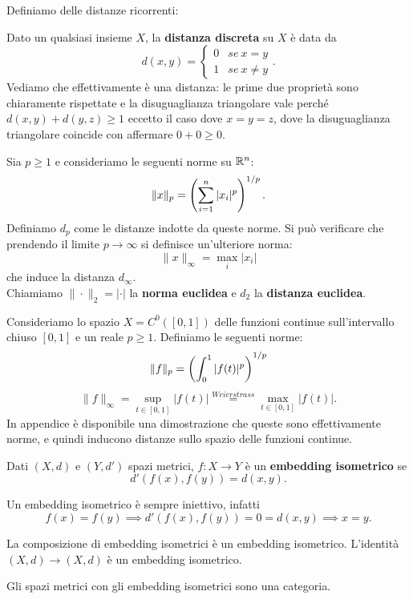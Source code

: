\begin{multicols*}{2}
\noindent Definiamo delle distanze ricorrenti:
\begin{definition}
Dato un qualsiasi insieme $X$, la \textbf{distanza discreta} su $X$ è data da
\[d(x,y)=\begin{cases}
0& se\ x=y\\
1& se\ x\neq y
\end{cases}.\]
Vediamo che effettivamente è una distanza: le prime due proprietà sono chiaramente rispettate e la disuguaglianza triangolare vale perché $d(x,y)+d(y,z)\geq1$ eccetto il caso dove $x=y=z$, dove la disuguaglianza triangolare coincide con affermare $0+0\geq0$.
\end{definition}
\begin{definition}[Distanze $p$]
Sia $p\geq1$ e consideriamo le seguenti norme su $\mathbb{R}^n$:
\[\|x\|_p=\left(\sum_{i=1}^n|x_i|^p\right)^{1/p}.\]
Definiamo $d_p$ come le distanze indotte da queste norme. Si può verificare che prendendo il limite $p\to\infty$ si definisce un'ulteriore norma:
\[\|x\|_\infty=\max_i|x_i|\]
che induce la distanza $d_\infty$.\\
Chiamiamo $\|\cdot\|_2=|\cdot|$ la \textbf{norma euclidea} e $d_2$ la \textbf{distanza euclidea}.
\end{definition}

\begin{definition}
Consideriamo lo spazio $X=C^0([0,1])$ delle funzioni continue sull'intervallo chiuso $[0,1]$ e un reale $p\geq1$. Definiamo le seguenti norme:
\[\|f\|_p=\left(\int_0^1|f(t)|^p\right)^{1/p}\]
\[\|f\|_\infty=\sup_{t\in[0,1]}|f(t)|\overset{Weierstrass}{=}\max_{t\in[0,1]}|f(t)|.\]
In appendice è disponibile una dimostrazione che queste sono effettivamente norme, e quindi inducono distanze sullo spazio delle funzioni continue.
\end{definition}

\begin{definition}
Dati $(X,d)$ e $(Y,d')$ spazi metrici, $f:X\to Y$ è un \textbf{embedding isometrico} se \[d'(f(x),f(y))=d(x,y).\]
\end{definition}
\begin{remark}
Un embedding isometrico è sempre iniettivo, infatti
\[f(x)=f(y)\implies d'(f(x),f(y))=0=d(x,y)\implies x=y.\]
\end{remark}
\begin{remark}
La composizione di embedding isometrici è un embedding isometrico. L'identità $(X,d)\to(X,d)$ è un embedding isometrico.
\end{remark}
\begin{remark}
Gli spazi metrici con gli embedding isometrici sono una categoria.
\end{remark}


\end{multicols*}
